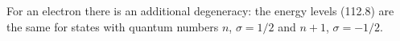 For an electron there is an additional degeneracy: the energy levels (112.8) are the same for states with quantum numbers $n$, $\sigma=1/2$ and $n+1$, $\sigma=-1/2$.


